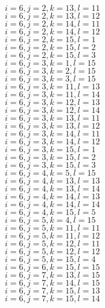 \documentclass[14pt]{article}
\begin{document}
    $i=6,j=2,k=13,l=11 $ \\ 
    $i=6,j=2,k=13,l=12 $ \\ 
    $i=6,j=2,k=14,l=11 $ \\ 
    $i=6,j=2,k=14,l=12 $ \\ 
    $i=6,j=2,k=15,l=1 $ \\ 
    $i=6,j=2,k=15,l=2 $ \\ 
    $i=6,j=2,k=15,l=3 $ \\ 
    $i=6,j=3,k=1,l=15 $ \\ 
    $i=6,j=3,k=2,l=15 $ \\ 
    $i=6,j=3,k=3,l=15 $ \\ 
    $i=6,j=3,k=11,l=13 $ \\ 
    $i=6,j=3,k=11,l=14 $ \\ 
    $i=6,j=3,k=12,l=13 $ \\ 
    $i=6,j=3,k=12,l=14 $ \\ 
    $i=6,j=3,k=13,l=11 $ \\ 
    $i=6,j=3,k=13,l=12 $ \\ 
    $i=6,j=3,k=14,l=11 $ \\ 
    $i=6,j=3,k=14,l=12 $ \\ 
    $i=6,j=3,k=15,l=1 $ \\ 
    $i=6,j=3,k=15,l=2 $ \\ 
    $i=6,j=3,k=15,l=3 $ \\ 
    $i=6,j=4,k=5,l=15 $ \\ 
    $i=6,j=4,k=13,l=13 $ \\ 
    $i=6,j=4,k=13,l=14 $ \\ 
    $i=6,j=4,k=14,l=13 $ \\ 
    $i=6,j=4,k=14,l=14 $ \\ 
    $i=6,j=4,k=15,l=5 $ \\ 
    $i=6,j=5,k=4,l=15 $ \\ 
    $i=6,j=5,k=11,l=11 $ \\ 
    $i=6,j=5,k=11,l=12 $ \\ 
    $i=6,j=5,k=12,l=11 $ \\ 
    $i=6,j=5,k=12,l=12 $ \\ 
    $i=6,j=5,k=15,l=4 $ \\ 
    $i=6,j=6,k=15,l=15 $ \\ 
    $i=6,j=7,k=13,l=15 $ \\ 
    $i=6,j=7,k=14,l=15 $ \\ 
    $i=6,j=7,k=15,l=13 $ \\ 
    $i=6,j=7,k=15,l=14 $ \\ 
\end{document}
